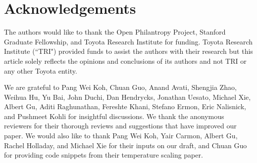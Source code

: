 \section{Acknowledgements}

The authors would like to thank the Open Philantropy Project, Stanford Graduate Fellowship, and Toyota Research Institute for funding. Toyota Research Institute (``TRI") provided funds to assist the authors with their research but this article solely reflects the opinions and conclusions of its authors and not TRI or any other Toyota entity.

We are grateful to Pang Wei Koh, Chuan Guo, Anand Avati, Shengjia Zhao, Weihua Hu, Yu Bai, John Duchi, Dan Hendrycks, Jonathan Uesato, Michael Xie, Albert Gu, Aditi Raghunathan, Fereshte Khani, Stefano Ermon, Eric Nalisnick, and Pushmeet Kohli for insightful discussions. We thank the anonymous reviewers for their thorough reviews and suggestions that have improved our paper. We would also like to thank Pang Wei Koh, Yair Carmon, Albert Gu, Rachel Holladay, and Michael Xie for their inputs on our draft, and Chuan Guo for providing code snippets from their temperature scaling paper.

\newpage




